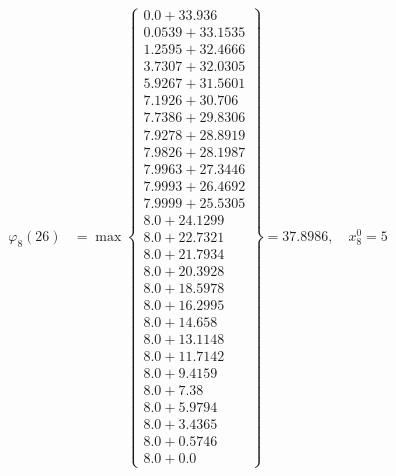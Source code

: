 \documentclass{article}
\begin{document}
\begin{align*}
\varphi_{8}(26) &= \max \left\{ \begin{array}{c}
0.0 + 33.936 \\
 0.0539 + 33.1535 \\
 1.2595 + 32.4666 \\
 3.7307 + 32.0305 \\
 5.9267 + 31.5601 \\
 7.1926 + 30.706 \\
 7.7386 + 29.8306 \\
 7.9278 + 28.8919 \\
 7.9826 + 28.1987 \\
 7.9963 + 27.3446 \\
 7.9993 + 26.4692 \\
 7.9999 + 25.5305 \\
 8.0 + 24.1299 \\
 8.0 + 22.7321 \\
 8.0 + 21.7934 \\
 8.0 + 20.3928 \\
 8.0 + 18.5978 \\
 8.0 + 16.2995 \\
 8.0 + 14.658 \\
 8.0 + 13.1148 \\
 8.0 + 11.7142 \\
 8.0 + 9.4159 \\
 8.0 + 7.38 \\
 8.0 + 5.9794 \\
 8.0 + 3.4365 \\
 8.0 + 0.5746 \\
 8.0 + 0.0
\end{array} \right\}=37.8986, \quad x_{8}^0=5\\
  

\end{align*}
\end{document}
